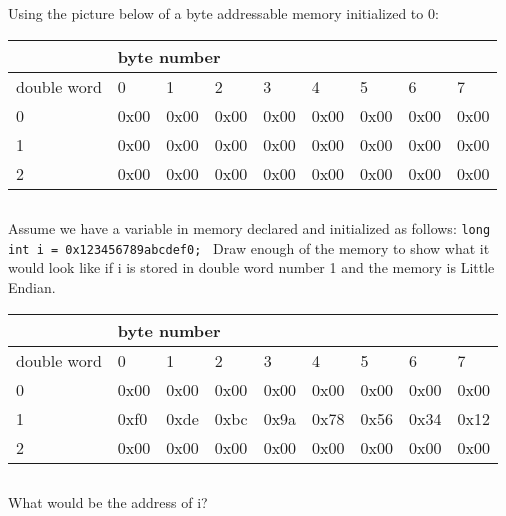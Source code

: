 \documentclass{article}
\begin{document}
\section{} 
Using the picture below of a byte addressable memory initialized to 0:
\vspace{5mm}

\begin{tabular}{|l|l|l|l|l|l|l|l|l|}
\hline
 & \multicolumn{8}{|l|}{byte number} \\ \hline
double word & 0 & 1 & 2 & 3 & 4 & 5 & 6 & 7 \\ \hline
0 & 0x00 & 0x00 & 0x00 & 0x00 & 0x00 & 0x00 & 0x00 & 0x00 \\ \hline
1 & 0x00 & 0x00 & 0x00 & 0x00 & 0x00 & 0x00 & 0x00 & 0x00 \\ \hline
2 & 0x00 & 0x00 & 0x00 & 0x00 & 0x00 & 0x00 & 0x00 & 0x00 \\ \hline
\end{tabular}
\vspace{10mm}

\subsection{}
Assume we have a variable in memory declared and initialized as follows: 
\texttt{long int i = 0x123456789abcdef0; } 
Draw enough of the memory to show what it would look like if i is stored in double word number 1 and the memory is Little Endian.
\vspace{5mm}

\begin{tabular}{l|l|l|l|l|l|l|l|l|}
\cline{2-9}
 & \multicolumn{8}{|l|}{byte number} \\ \hline
\multicolumn{1}{|l|}{double word} & 0 & 1 & 2 & 3 & 4 & 5 & 6 & 7 \\ \hline
\multicolumn{1}{|l|}{0} & 0x00 & 0x00 & 0x00 & 0x00 & 0x00 & 0x00 & 0x00 & 0x00 \\ \hline
\multicolumn{1}{|l|}{1} & 0xf0 & 0xde & 0xbc & 0x9a & 0x78 & 0x56 & 0x34 & 0x12 \\ \hline
\multicolumn{1}{|l|}{2} & 0x00 & 0x00 & 0x00 & 0x00 & 0x00 & 0x00 & 0x00 & 0x00 \\ \hline
\end{tabular}

\subsection{}
What would be the address of i? 
\vspace{5mm}
\end{document}
